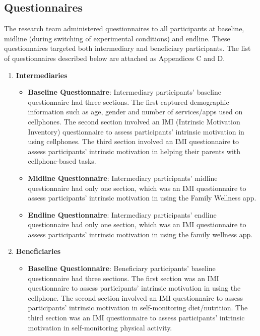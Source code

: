 \subsection{Questionnaires}\label{methodsquestionnaire}
The research team administered questionnaires to all participants at baseline, midline (during switching of experimental conditions) and endline. These questionnaires targeted both intermediary and beneficiary participants. The list of questionnaires described below are attached as Appendices C and D.
\begin{enumerate}
\item{\textbf{Intermediaries}}
\begin{itemize}
\item{\textbf{Baseline Questionnaire}}: Intermediary participants' baseline questionnaire had three sections. The first captured demographic information such as age, gender and number of services/apps used on cellphones. The second section involved an IMI (Intrinsic Motivation Inventory) questionnaire  to assess participants' intrinsic motivation in using cellphones. The third section involved an IMI questionnaire to assess participants' intrinsic motivation in helping their parents with cellphone-based tasks. 

\item{\textbf{Midline Questionnaire}}: Intermediary participants' midline questionnaire had only one section, which was an IMI questionnaire  to assess participants' intrinsic motivation in using the Family Wellness app.

\item{\textbf{Endline Questionnaire}}: Intermediary participants' endline questionnaire had only one section, which was an IMI questionnaire  to assess participants' intrinsic motivation in using the family wellness app.
\end{itemize}

\item{\textbf{Beneficiaries}}

\begin{itemize}
\item{\textbf{Baseline Questionnaire}}: Beneficiary participants' baseline questionnaire had three sections. The first section was an IMI questionnaire  to assess participants' intrinsic motivation in using the cellphone. The second section involved an IMI questionnaire to assess participants' intrinsic motivation in self-monitoring diet/nutrition. The third section was an IMI questionnaire to assess participants' intrinsic motivation in self-monitoring physical activity.


\end{itemize}
\end{enumerate}
